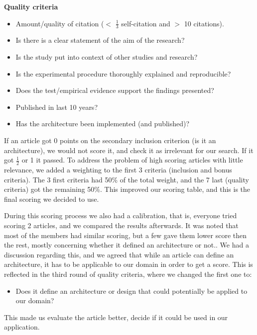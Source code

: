 \textbf{Quality criteria}
\begin{itemize}
\item Amount/quality of citation ($<$ $\frac{1}{3}$  self-citation and $>$ 10 citations).
\item Is there is a clear statement of the aim of the research?
\item Is the study put into context of other studies and research?
\item Is the experimental procedure thoroughly explained and reproducible?
\item Does the test/empirical evidence support the findings presented?
\item Published in last 10 years?
\item Has the architecture been implemented (and published)?
\end{itemize}

If an article got 0 points on the secondary inclusion criterion (is it an architecture), we would not score it, and check it as irrelevant for our search. If it got $\frac{1}{2}$  or 1 it passed. To address the problem of high scoring articles with little relevance, we added a weighting to the first 3 criteria (inclusion and bonus criteria). The 3 first criteria had 50\% of the total weight, and the 7 last (quality criteria) got the remaining 50\%. This improved our scoring table, and this is the final scoring we decided to use.

During this scoring process we also had a calibration, that is, everyone tried scoring 2 articles, and we compared the results afterwards. It was noted that most of the members had similar scoring, but a few gave them lower score then the rest, mostly concerning whether it defined an architecture or not.. We had a discussion regarding this, and we agreed that while an article can define an architecture, it has to be applicable to our domain in order to get a score. This is reflected in the third round of quality criteria, where we changed the first one to:
\begin{itemize}
\item Does it define an architecture or design that could potentially be applied to our domain?
\end{itemize}

This made us evaluate the article better, decide if it could be used in our application.